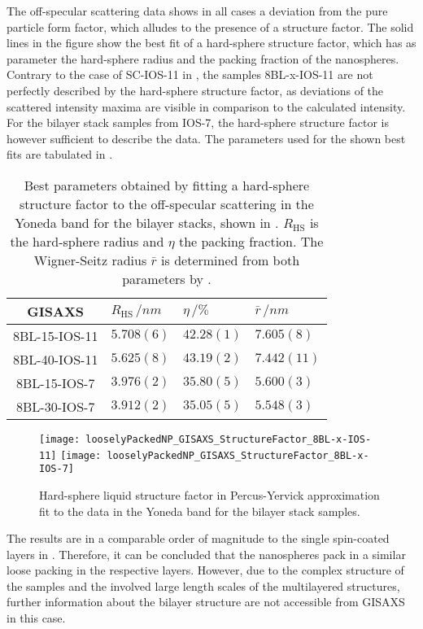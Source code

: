 \documentclass[\main/dresen_thesis.tex]{subfiles}
\begin{document}
  The off-specular scattering data shows in all cases a deviation from the pure particle form factor, which alludes to the presence of a structure factor.
  The solid lines in the figure show the best fit of a hard-sphere structure factor, which has as parameter the hard-sphere radius and the packing fraction of the nanospheres.
  Contrary to the case of SC-IOS-11 in , the samples 8BL-x-IOS-11 are not perfectly described by the hard-sphere structure factor, as deviations of the scattered intensity maxima are visible in comparison to the calculated intensity.
  For the bilayer stack samples from IOS-7, the hard-sphere structure factor is however sufficient to describe the data.
  The parameters used for the shown best fits are tabulated in .

  \begin{table}[tb]
    \centering
    \caption{\label{tab:looselyPackedNP:bilayerStacks:gisaxs}Best parameters obtained by fitting a hard-sphere structure factor to the off-specular scattering in the Yoneda band for the bilayer stacks, shown in . $R_\mathrm{HS}$ is the hard-sphere radius and $\eta$ the packing fraction. The Wigner-Seitz radius $\bar{r}$ is determined from both parameters by .}
    \begin{tabular}{ c | l | l | l}
      \rule{0pt}{2ex} \textbf{GISAXS}  & $R_\mathrm{HS} \, / \unit{nm}$ &$\eta \, / \unit{\%}$ & $\bar{r} \, / \unit{nm}$ \\
      \hline
      \rule{0pt}{2ex} 8BL-15-IOS-11    & $5.708(6)$    & $42.28(1)$ & $7.605(8)$\\
      \rule{0pt}{2ex} 8BL-40-IOS-11    & $5.625(8)$    & $43.19(2)$ & $7.442(11)$\\
      \rule{0pt}{2ex} 8BL-15-IOS-7     & $3.976(2)$    & $35.80(5)$ & $5.600(3)$\\
      \rule{0pt}{2ex} 8BL-30-IOS-7     & $3.912(2)$    & $35.05(5)$ & $5.548(3)$\\
      \hline
    \end{tabular}
  \end{table}

  \begin{figure}[tb]
    \centering
    \texttt{[image: looselyPackedNP\_GISAXS\_StructureFactor\_8BL-x-IOS-11]}
    \texttt{[image: looselyPackedNP\_GISAXS\_StructureFactor\_8BL-x-IOS-7]}
    \caption{\label{fig:looselyPackedNP:bilayerStacks:gisaxsHardSphereSF}Hard-sphere liquid structure factor in Percus-Yervick approximation fit to the data in the Yoneda band for the bilayer stack samples.}
  \end{figure}

  The results are in a comparable order of magnitude to the single spin-coated layers in .
  Therefore, it can be concluded that the nanospheres pack in a similar loose packing in the respective layers.
  However, due to the complex structure of the samples and the involved large length scales of the multilayered structures, further information about the bilayer structure are not accessible from GISAXS in this case.
\end{document}
